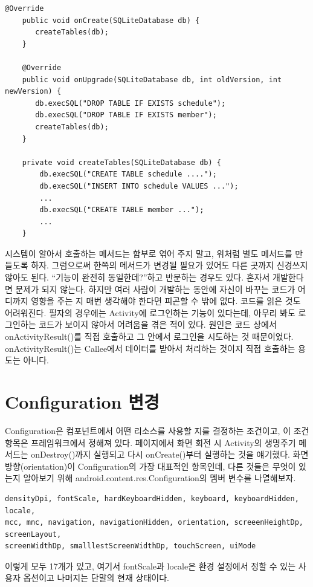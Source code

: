 \begin{lstlisting}[frame=single]
	@Override
	public void onCreate(SQLiteDatabase db) {
	   createTables(db);
	}
	
	@Override
	public void onUpgrade(SQLiteDatabase db, int oldVersion, int newVersion) {
	   db.execSQL("DROP TABLE IF EXISTS schedule");
	   db.execSQL("DROP TABLE IF EXISTS member");
	   createTables(db);
	}
	
	private void createTables(SQLiteDatabase db) {
		db.execSQL("CREATE TABLE schedule ....");
	    db.execSQL("INSERT INTO schedule VALUES ...");
	    ...
	    db.execSQL("CREATE TABLE member ...");
	    ...
	}
\end{lstlisting}

시스템이 알아서 호출하는 메서드는 함부로 엮어 주지 말고, 위처럼 별도 메서드를 만들도록 하자. 
그럼으로써 한쪽의 메서드가 변경될 필요가 있어도 다른 곳까지 신경쓰지 않아도 된다.
``기능이 완전히 동일한데?''하고 반문하는 경우도 있다. 혼자서 개발한다면 문제가 되지 않는다. 
하지만 여러 사람이 개발하는 동안에 자신이 바꾸는 코드가 어디까지 영향을 주는 지 매번 생각해야 한다면 피곤할 수 밖에 없다. 
코드를 읽은 것도 어려워진다. 
필자의 경우에는 Activity에 로그인하는 기능이 있다는데, 아무리 봐도 로그인하는 코드가 보이지 않아서 어려움을 겪은 적이 있다. 
원인은 코드 상에서 onActivityResult()를 직접 호출하고 그 안에서 로그인을 시도하는 것 때문이었다. 
onActivityResult()는 Callee에서 데이터를 받아서 처리하는 것이지 직접 호출하는 용도는 아니다.

\section{Configuration 변경}
Configuration은 컴포넌트에서 어떤 리소스를 사용할 지를 결정하는 조건이고, 이 조건 항목은 프레임워크에서 정해져 있다. 
\pageref{flow}페이지에서 화면 회전 시 Activity의 생명주기 메서드는 onDestroy()까지 실행되고 다시 onCreate()부터 실행하는 것을 얘기했다. 
화면 방향(orientation)이 Configuration의 가장 대표적인 항목인데, 다른 것들은 무엇이 있는지 알아보기 위해 android.content.res.Configuration의 멤버 변수를 나열해보자. 
\begin{lstlisting}[frame=single]
densityDpi, fontScale, hardKeyboardHidden, keyboard, keyboardHidden, locale, 
mcc, mnc, navigation, navigationHidden, orientation, screeenHeightDp, screenLayout, 
screenWidthDp, smalllestScreenWidthDp, touchScreen, uiMode 
\end{lstlisting}
이렇게 모두 17개가 있고, 
여기서 fontScale과 locale은 환경 설정에서 정할 수 있는 사용자 옵션이고 나머지는 단말의 현재 상태이다.

